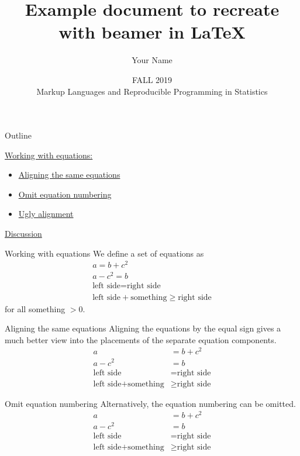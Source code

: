 \documentclass[aspectratio=169]{beamer}
\title{Example document to recreate with beamer in \LaTeX}
\author{Your Name \\ \vspace{1.6cm}}
\date{FALL 2019 \\ Markup Languages and Reproducible Programming in Statistics}
\begin{document}
\begin{frame}[plain]
    \vspace{1.6cm}
    \titlepage
\end{frame}

\begin{frame}{Outline}

\hyperlink{wwe}{Working with equations:}
\begin{itemize}
    \item[] \hyperlink{atse}{Aligning the same equations}
    \item[] \hyperlink{oen}{Omit equation numbering }
    \item[] \hyperlink{ua}{Ugly alignment}
\end{itemize} 
\vspace{1cm}
\hyperlink{diss}{Discussion}


\end{frame}

\begin{frame}[label=wwe]{Working with equations}
We define a set of equations as
\begin{gather}
    a = b + c^2 \\
    a - c^2 = b \\
    \text{left side} = \text{right side} \\
    \text{left side} + \text{something} \geq \text{right side}
\end{gather}
for all something $> 0$.
\end{frame}

\begin{frame}[label=atse]{Aligning the same equations}
Aligning the equations by the equal sign gives a much better view into the placements
of the separate equation components.
\begin{align}
    a &= b + c^2 \\
    a - c^2 &= b \\
    \text{left side} &= \text{right side} \\
    \text{left side} + \text{something} &\geq \text{right side}
\end{align}
\end{frame}

\begin{frame}[label=oen]{Omit equation numbering}
Alternatively, the equation numbering can be omitted.
\begin{align*}
    a &= b + c^2 \\
    a - c^2 &= b \\
    \text{left side} &= \text{right side} \\
    \text{left side} + \text{something} &\geq \text{right side}
\end{align*}
\end{frame}
\end{document}
